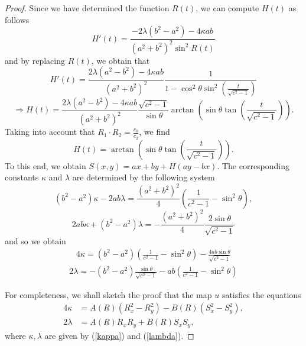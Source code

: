 \documentclass[12pt]{amsart}
\begin{document}
\begin{proof}
		
		Since we have determined the function $R(t)$, we can compute $H(t)$ as follows
		\[
		H'(t) = \frac{-2\lambda(b^2 - a^2) - 4\kappa ab}
		{(a^2 + b^2)^2 \sin^2R(t)}
		\]
		and by replacing $R(t)$, we obtain that
		\[
		H'(t) = \frac{2\lambda(a^2 - b^2) - 4\kappa ab}{(a^2 + b^2)^2}
		\frac{1}{1 - \cos^2\theta \sin^2(\frac{t}{\sqrt{c^2 - 1}})}
		\]
		\[
		\Rightarrow
		H(t) = 
		\frac{2\lambda(a^2 - b^2) - 4\kappa ab}{(a^2 + b^2)^2}
		\frac{\sqrt{c^2 - 1}}{\sin\theta}
		\arctan
		\left(
		\sin\theta \tan(\frac{t}{\sqrt{c^2 - 1}})
		\right).
		\]
		Taking into account that $R_1\cdot R_2 = \frac{c_0}{c_2}$, we find 
		\[
		H(t) =  \arctan
		\left(
		\sin\theta
		\tan
		\left(
		\frac{t}{\sqrt{c^2 - 1}}
		\right)
		\right).
		\]
		To this end, we obtain $S(x,y) = ax + by + H(ay - bx)$.
		The corresponding constants $\kappa$ and $\lambda$ are determined by the following system
		\[
		(b^2 - a^2)\kappa - 2ab\lambda = 
		\frac{(a^2 + b^2)^2}{4}
		\left(
		\frac{1}{c^2 - 1} - \sin^2\theta
		\right),
		\]
		\[
		2ab\kappa + (b^2 - a^2)\lambda = 
		- 
		\frac{(a^2 + b^2)^2}{4}
		\frac{2\sin\theta}{\sqrt{c^2- 1}}
		\]
		and so we obtain
		\begin{align}\label{kappa}
			4\kappa = 
			(b^2 - a^2)
			\left(\frac{1}{c^2 - 1} - \sin^2\theta\right) - 
			\frac{4ab\sin\theta}{\sqrt{c^2 - 1}}
		\end{align}
		\begin{align}\label{lambda}
			2\lambda= 
			-(b^2 - a^2)\frac{\sin\theta}{\sqrt{c^2 - 1}}
			- ab\left(\frac{1}{c^2 - 1} - \sin^2\theta\right)
		\end{align}
		
		
		
		For completeness, we shall sketch the proof that the map $u$ satisfies the equations 
		\begin{align*}
			4\kappa &= A(R)(R_x^2 - R_y^2) - B(R)(S_x^2 - S_y^2),
			\\
			2\lambda &= A(R)R_xR_y + B(R)S_xS_y,
		\end{align*}
		where $\kappa, \lambda$ are given by (\ref{kappa}) and (\ref{lambda}).
		

\end{proof}
\end{document}
